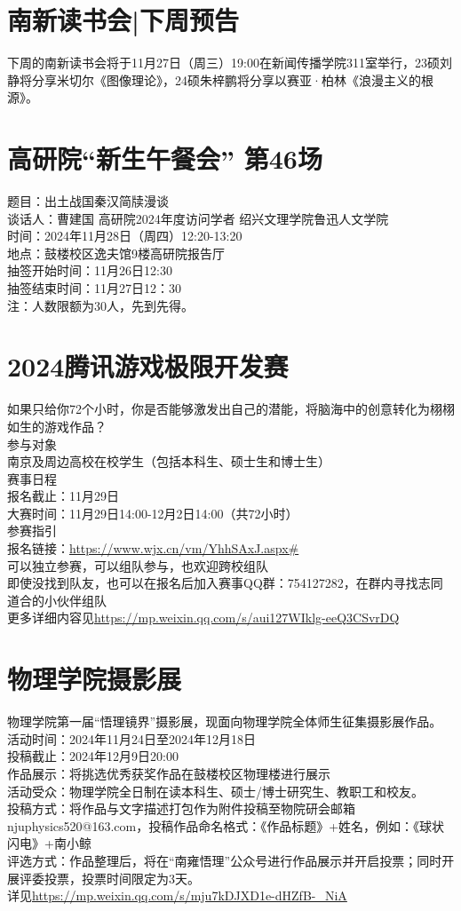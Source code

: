 \documentclass[letterpaper, 12pt]{article}
\begin{document}
\begin{multicols}{2}
\section{南新读书会|下周预告}
下周的南新读书会将于11月27日（周三）19:00在新闻传播学院311室举行，23硕刘静将分享米切尔《图像理论》，24硕朱梓鹏将分享以赛亚·柏林《浪漫主义的根源》。

\section{高研院“新生午餐会” 第46场}
题目：出土战国秦汉简牍漫谈\\
谈话人：曹建国 高研院2024年度访问学者 绍兴文理学院鲁迅人文学院\\
时间：2024年11月28日（周四）12:20-13:20\\
地点：鼓楼校区逸夫馆9楼高研院报告厅\\
抽签开始时间：11月26日12:30\\
抽签结束时间：11月27日12：30\\
注：人数限额为30人，先到先得。\\


\section{2024腾讯游戏极限开发赛}
如果只给你72个小时，你是否能够激发出自己的潜能，将脑海中的创意转化为栩栩如生的游戏作品？\\
参与对象\\
南京及周边高校在校学生（包括本科生、硕士生和博士生）\\
赛事日程\\
报名截止：11月29日\\
大赛时间：11月29日14:00-12月2日14:00（共72小时）\\
参赛指引\\
报名链接：\url{https://www.wjx.cn/vm/YhhSAxJ.aspx#}\\
可以独立参赛，可以组队参与，也欢迎跨校组队\\
即使没找到队友，也可以在报名后加入赛事QQ群：754127282，在群内寻找志同道合的小伙伴组队\\
更多详细内容见\url{https://mp.weixin.qq.com/s/aui127WIklg-eeQ3CSvrDQ}


\section{物理学院摄影展}
物理学院第一届“悟理镜界”摄影展，现面向物理学院全体师生征集摄影展作品。\\
活动时间：2024年11月24日至2024年12月18日\\
投稿截止：2024年12月9日20:00\\
作品展示：将挑选优秀获奖作品在鼓楼校区物理楼进行展示\\
活动受众：物理学院全日制在读本科生、硕士/博士研究生、教职工和校友。\\
投稿方式：将作品与文字描述打包作为附件投稿至物院研会邮箱njuphysics520@163.com，投稿作品命名格式：《作品标题》+姓名，例如：《球状闪电》+南小鲸\\
评选方式：作品整理后，将在“南雍悟理”公众号进行作品展示并开启投票；同时开展评委投票，投票时间限定为3天。\\
详见\url{https://mp.weixin.qq.com/s/mju7kDJXD1e-dHZfB-_NiA}

\end{multicols}
\end{document}
